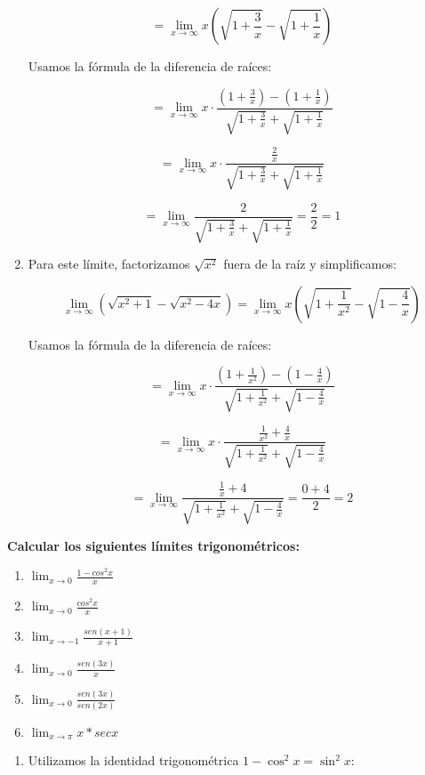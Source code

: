 \documentclass[answers]{exam} %
\begin{document}
\begin{questions}
\begin{solution}
\begin{enumerate}[label=\alph*.]
			\[
			= \lim_{x\to{\infty}} x (\sqrt{1+\frac{3}{x}} - \sqrt{1+\frac{1}{x}})
			\]
	
			Usamos la fórmula de la diferencia de raíces:
	
			\[
			= \lim_{x\to{\infty}} x \cdot \frac{(1+\frac{3}{x}) - (1+\frac{1}{x})}{\sqrt{1+\frac{3}{x}} + \sqrt{1+\frac{1}{x}}}
			\]
	
			\[
			= \lim_{x\to{\infty}} x \cdot \frac{\frac{2}{x}}{\sqrt{1+\frac{3}{x}} + \sqrt{1+\frac{1}{x}}}
			\]
	
			\[
			= \lim_{x\to{\infty}} \frac{2}{\sqrt{1+\frac{3}{x}} + \sqrt{1+\frac{1}{x}}} = \frac{2}{2} = 1
			\]
	
			\item Para este límite, factorizamos \(\sqrt{x^2}\) fuera de la raíz y simplificamos:
	
			\[
			\lim_{x\to{\infty}} (\sqrt{x^2+1}-\sqrt{x^2-4x}) = \lim_{x\to{\infty}} x(\sqrt{1+\frac{1}{x^2}}-\sqrt{1-\frac{4}{x}})
			\]
	
			Usamos la fórmula de la diferencia de raíces:
	
			\[
			= \lim_{x\to{\infty}} x \cdot \frac{(1+\frac{1}{x^2}) - (1-\frac{4}{x})}{\sqrt{1+\frac{1}{x^2}} + \sqrt{1-\frac{4}{x}}}
			\]
	
			\[
			= \lim_{x\to{\infty}} x \cdot \frac{\frac{1}{x^2} + \frac{4}{x}}{\sqrt{1+\frac{1}{x^2}} + \sqrt{1-\frac{4}{x}}}
			\]
	
			\[
			= \lim_{x\to{\infty}} \frac{\frac{1}{x} + 4}{\sqrt{1+\frac{1}{x^2}} + \sqrt{1-\frac{4}{x}}} = \frac{0+4}{2} = 2
			\]
	
		\end{enumerate}
	\end{solution}
	

	\vspace{0.5cm}

	\question \large\textbf{Calcular los siguientes límites trigonométricos:}
	\begin{enumerate}[label=\alph*.]
		\item $\displaystyle \lim_{x\to{0}} \frac{1- cos^2 x}{x}$
		\item $\displaystyle \lim_{x\to{0}} \frac{cos^2 x}{x}$
		\item $\displaystyle \lim_{x\to{-1}} \frac{sen(x+1)}{x+1}$
		\item $\displaystyle \lim_{x\to{0}} \frac{sen(3x)}{x}$
		\item $\displaystyle \lim_{x\to{0}} \frac{sen(3x)}{sen(2x)}$
		\item $\displaystyle \lim_{x\to{\pi}} x * secx$
	\end{enumerate}
	\begin{solution}
		\begin{enumerate}[label=\alph*.]
			\item Utilizamos la identidad trigonométrica \(1 - \cos^2 x = \sin^2 x\):
	

\end{enumerate}
\end{solution}
\end{questions}
\end{document}

